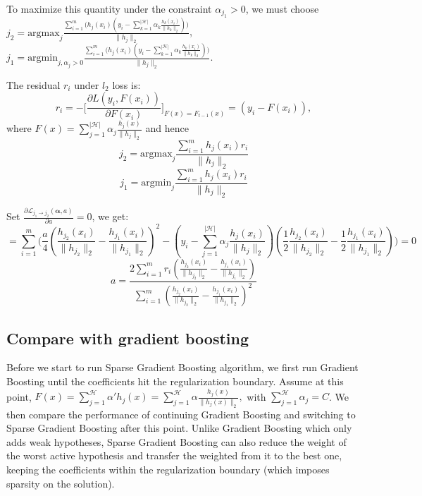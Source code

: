 \documentclass{article} %
\begin{document}
To maximize this quantity under the constraint $\alpha_{j_1}>0$, we must choose \\$j_{2}=\mbox{argmax}_j   \frac{\sum_{i=1}^{m}\bigg(h_{j}(x_{i})(y_{i}-\sum_{k=1}^{|\mathcal{H}|}\alpha_{k} \frac{h_{k}(x_{i})}  {\| h_{k}\|_2} )\bigg) }  {\| h_{j}\|_2} $,\\
$j_{1}=\mbox{argmin}_{j,\alpha_{j}>0}  \frac{\sum_{i=1}^{m}\bigg(h_{j}(x_{i})(y_{i}-\sum_{k=1}^{|\mathcal{H}|}\alpha_{k} \frac{h_{k}(x_{i})}  {\| h_{k}\|_2} )\bigg) }  {\| h_{j}\|_2} $.


The residual $r_{i}$ under $l_2$ loss is:
$$r_{i}=-\big[\frac{\partial L(y_i,F(x_i))}{\partial F(x_i)}\big]_{F(x)=F_{t-1}(x)}=(y_i-F(x_i)),$$ where $F(x)= \sum_{j=1}^{|\mathcal{H}|}\alpha_{j}  \frac{h_{j}(x)}  {\| h_{j}\|_2}$   and  hence
$$j_{2}=\mbox{argmax}_j   \frac{\sum_{i=1}^{m}h_{j}(x_{i})r_i }  {\| h_{j}\|_2} $$
$$j_{1}=\mbox{argmin}_j   \frac{\sum_{i=1}^{m}h_{j}(x_{i})r_i }  {\| h_{j}\|_2} $$




Set $\frac{\partial\mathcal{L}_{j_{1}\rightarrow j_{2}}(\mathbf{\alpha},a)}{\partial a} =0 $, we get:
\[
=\sum_{i=1}^{m}\bigg(\frac{a}{4} ( \frac{h_{j_{2}}(x_{i})} { \| h_{j_2}\|_2}-  \frac{h_{j_{1}}(x_{i}) }{\| h_{j_1}\|_2} )^{2}-(y_{i}-\sum_{j=1}^{|\mathcal{H}|}\alpha_{j}  \frac{h_{j}(x_{i})}  {\| h_{j}\|_2})(\frac{1}{2} \frac{h_{j_{2}}(x_{i})}  {\| h_{j_2}\|_2}-\frac{1}{2} \frac{h_{j_{1}}(x_{i})}  {\| h_{j_1}\|_2})\bigg)=0\]
\[ a=\frac{2\sum_{i=1}^{m}r_i  (\frac{h_{j_2}(x_{i})}  {\| h_{j_2}\|_2}  - \frac{h_{j_1}(x_{i})} {\| h_{j_1}\|_2} )}{\sum_{i=1}^{m}(  \frac{h_{j_2}(x_{i})} {\| h_{j_2}\|_2}- \frac{h_{j_1}(x_{i})} {\| h_{j_1}\|_2})^{2}}\]


\subsection{Compare with gradient boosting}
Before we start to run Sparse Gradient Boosting algorithm, we first run Gradient Boosting until the coefficients hit the regularization boundary. Assume at this point, $F(x)=\sum_{j=1}^{\mathcal{H}} \alpha' h_j(x)=\sum_{j=1}^{\mathcal{H}} \alpha \frac{h_j(x)}{\|h_j(x)\|_2},$  with $\sum_{j=1}^{\mathcal{H}}\alpha_j = C$. We then compare the performance of continuing Gradient Boosting and switching to Sparse Gradient Boosting after this point.  Unlike Gradient Boosting which only adds weak hypotheses, Sparse Gradient Boosting can also reduce the weight of the worst active hypothesis and transfer the weighted from it to the best one, keeping the coefficients within the regularization boundary (which imposes sparsity on the solution).
\end{document}
